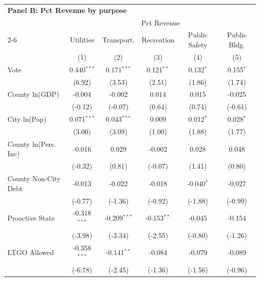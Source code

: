 \begingroup
\centering
\begin{tabular*}{\textwidth}{@{\extracolsep{\fill}}lccccc}
\multicolumn{5}{l}{\textbf{Panel B: Pct Revenue by purpose}}\\

\addlinespace
   \toprule
    & \multicolumn{5}{c}{Pct Revenue}\\
   \cmidrule(lr){2-6}
                        & Utilities      & Transport.     & Recreation    & Public Safety & Public Bldg. \\   
                        & (1)            & (2)            & (3)           & (4)           & (5)\\  
   \midrule 
   Vote                 & 0.440$^{***}$  & 0.171$^{***}$  & 0.121$^{**}$  & 0.132$^{*}$   & 0.155$^{*}$\\   
                        & (6.92)        & (3.53)        & (2.51)       & (1.86)       & (1.74)\\   
   County ln(GDP)       & -0.004         & -0.002         & 0.014         & 0.015         & -0.025\\   
                        & (-0.12)       & (-0.07)       & (0.64)       & (0.74)       & (-0.61)\\   
   City ln(Pop)         & 0.071$^{***}$  & 0.043$^{***}$  & 0.009         & 0.012$^{*}$   & 0.028$^{*}$\\   
                        & (3.00)        & (3.09)        & (1.00)       & (1.88)       & (1.77)\\   
   County ln(Pers. Inc) & -0.016         & 0.029          & -0.002        & 0.028         & 0.048\\   
                        & (-0.32)       & (0.81)        & (-0.07)      & (1.41)       & (0.80)\\   
   County Non-City Debt & -0.013         & -0.022         & -0.018        & -0.040$^{*}$  & -0.027\\   
                        & (-0.77)       & (-1.36)       & (-0.92)      & (-1.88)      & (-0.99)\\   
   Proactive State      & -0.318$^{***}$ & -0.209$^{***}$ & -0.153$^{**}$ & -0.045        & -0.154\\   
                        & (-3.98)       & (-3.34)       & (-2.55)      & (-0.80)      & (-1.26)\\   
   LTGO Allowed         & -0.358$^{***}$ & -0.141$^{**}$  & -0.084        & -0.079        & -0.089\\   
                        & (-6.78)       & (-2.45)       & (-1.36)      & (-1.56)      & (-0.96)\\   

\end{tabular*}
